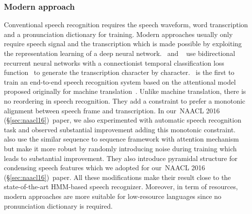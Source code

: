 \documentclass[12pt,twoside,final,hidelinks]{ltthesis}
\theoremstyle{definition}
\newcommand\naaclvi{NAACL 2016 (\S\ref{sec:naacl16})}
\begin{document}
\subsubsection{Modern approach}
Conventional speech recognition requires the speech waveform, word transcription and a pronunciation dictionary for training. Modern approaches usually only require speech signal and the transcription which is made possible by exploiting the representation learning of a deep neural network.~ and ~ use bidirectional recurrent neural networks with a connectionist temporal classification loss function~\cite{Graves06connectionisttemporal} to generate the transcription character by character.~ is the first to train an end-to-end speech recognition system based on the attentional model proposed originally for machine translation~\cite{DBLP:journals/corr/BahdanauCB14}. Unlike machine translation, there is no reordering in speech recognition. They add a constraint to prefer a monotonic alignment between speech frame and transcription. In our~\naaclvi\ paper, we also experimented with automatic speech recognition task and observed substantial improvement adding this monotonic constraint.~ also use the similar sequence to sequence framework with attention mechanism but make it more robust by randomly introducing noise during training which leads to substantial improvement. They also introduce pyramidal structure for condensing speech features which we adopted for our~\naaclvi\ paper. All these modifications make their result close to the state-of-the-art HMM-based speech recognizer. Moreover, in term of resources, modern approaches are more suitable for low-resource languages since no pronunciation dictionary is required. 
\end{document}
